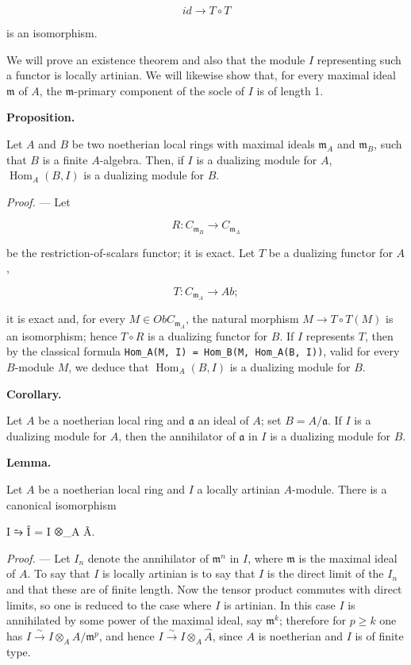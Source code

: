 \documentclass[
  11pt,
  a4paper,
]{book}
\newenvironment{Shaded}{}{}
\newcommand{\NormalTok}[1]{#1}
\begin{document}
\[ id \longrightarrow T \circ T \]

is an isomorphism.

We will prove an existence theorem and also that the module \(I\)
representing such a functor is locally artinian. We will likewise show
that, for every maximal ideal \(\mathfrak{m}\) of \(A\), the
\(\mathfrak{m}\)-primary component of the socle of \(I\) is of length 1.

\textbf{Proposition.}

Let \(A\) and \(B\) be two noetherian local rings with maximal ideals
\(\mathfrak{m}_{A}\) and \(\mathfrak{m}_{B}\), such that \(B\) is a
finite \(A\)-algebra. Then, if \(I\) is a dualizing module for \(A\),
\(\operatorname{Hom}_{A}(B, I)\) is a dualizing module for \(B\).

\emph{Proof.} --- Let

\[ R : C_{\mathfrak{m}_{B}} \longrightarrow C_{\mathfrak{m}_{A}} \]

be the restriction-of-scalars functor; it is exact. Let \(T\) be a
dualizing functor for \(A\),

\[ T : C_{\mathfrak{m}_{A}} \longrightarrow Ab; \]

it is exact and, for every \(M \in Ob C_{\mathfrak{m}_{A}}\), the
natural morphism \(M \to T \circ T(M)\) is an isomorphism; hence
\(T \circ R\) is a dualizing functor for \(B\). If \(I\) represents
\(T\), then by the classical formula
\texttt{Hom\_A(M,\ I)\ =\ Hom\_B(M,\ Hom\_A(B,\ I))}, valid for every
\(B\)-module \(M\), we deduce that \(\operatorname{Hom}_{A}(B, I)\) is a
dualizing module for \(B\).

\textbf{Corollary.}

Let \(A\) be a noetherian local ring and \(\mathfrak{a}\) an ideal of
\(A\); set \(B = A/\mathfrak{a}\). If \(I\) is a dualizing module for
\(A\), then the annihilator of \(\mathfrak{a}\) in \(I\) is a dualizing
module for \(B\).

\textbf{Lemma.}

Let \(A\) be a noetherian local ring and \(I\) a locally artinian
\(A\)-module. There is a canonical isomorphism

\begin{Shaded}
\begin{Highlighting}[]
\NormalTok{I ⥲ Î = I ⊗\_A Â.}
\end{Highlighting}
\end{Shaded}

\emph{Proof.} --- Let \(I_{n}\) denote the annihilator of
\(\mathfrak{m}^{n}\) in \(I\), where \(\mathfrak{m}\) is the maximal
ideal of \(A\). To say that \(I\) is locally artinian is to say that
\(I\) is the direct limit of the \(I_{n}\) and that these are of finite
length. Now the tensor product commutes with direct limits, so one is
reduced to the case where \(I\) is artinian. In this case \(I\) is
annihilated by some power of the maximal ideal, say
\(\mathfrak{m}^{k}\); therefore for \(p \geqslant
k\) one has \(I \xrightarrow{\sim} I \otimes_{A} A/\mathfrak{m}^{p}\),
and hence \(I \xrightarrow{\sim} I \otimes_{A}
\hat{A}\), since \(A\) is noetherian and \(I\) is of finite type.
\end{document}
